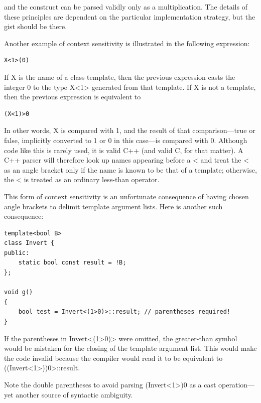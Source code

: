 and the construct can be parsed validly only as a multiplication. The details of these principles are dependent on the particular implementation strategy, but the gist should be there.

Another example of context sensitivity is illustrated in the following expression:

\begin{lstlisting}[style=styleCXX]
X<1>(0)
\end{lstlisting}

If X is the name of a class template, then the previous expression casts the integer 0 to the type X<1> generated from that template. If X is not a template, then the previous expression is equivalent to

\begin{lstlisting}[style=styleCXX]
(X<1)>0
\end{lstlisting}

In other words, X is compared with 1, and the result of that comparison—true or false, implicitly converted to 1 or 0 in this case—is compared with 0. Although code like this is rarely used, it is valid C++ (and valid C, for that matter). A C++ parser will therefore look up names appearing before a < and treat the < as an angle bracket only if the name is known to be that of a template; otherwise, the < is treated as an ordinary less-than operator.

This form of context sensitivity is an unfortunate consequence of having chosen angle brackets to delimit template argument lists. Here is another such consequence:

\begin{lstlisting}[style=styleCXX]
template<bool B>
class Invert {
public:
	static bool const result = !B;
};

void g()
{
	bool test = Invert<(1>0)>::result; // parentheses required!
}
\end{lstlisting}

If the parentheses in Invert<(1>0)> were omitted, the greater-than symbol would be mistaken for the closing of the template argument list. This would make the code invalid because the compiler would read it to be equivalent to ((Invert<1>))0>::result.

\begin{tcolorbox}[colback=webgreen!5!white,colframe=webgreen!75!black]
\hspace*{0.75cm}Note the double parentheses to avoid parsing (Invert<1>)0 as a cast operation—yet another source of syntactic ambiguity.
\end{tcolorbox}

